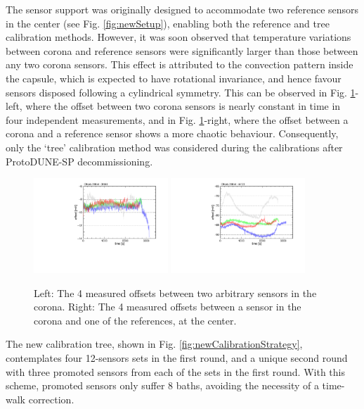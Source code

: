 \noindent The sensor support was originally designed to accommodate two reference sensors in the center (see Fig. \ref{fig:newSetup}), enabling both the reference and tree calibration methods. However, it was soon observed that temperature variations between corona and reference sensors were significantly larger than those between any two corona sensors. This effect is attributed to the convection pattern inside the capsule, which is expected to have rotational invariance, and hence favour sensors disposed following a cylindrical symmetry. This can be observed in Fig. \ref{fig:refMethodDumpingJustification}-left, where the offset between two corona sensors is nearly constant in time in four independent measurements, and in Fig. \ref{fig:refMethodDumpingJustification}-right, where the offset between a corona and a reference sensor shows a more chaotic behaviour. Consequently, only the `tree' calibration method was considered during the calibrations after ProtoDUNE-SP decommissioning.

\begin{figure}[htbp]
\centering
{\includegraphics[width=0.45\textwidth]{images/figure_17_a.pdf}}
{\includegraphics[width=0.45\textwidth]{images/figure_17_b.pdf}}
\caption{Left: The 4 measured offsets between two arbitrary sensors in the corona. Right: The 4 measured offsets between a sensor in the corona and one of the references, at the center.}
\label{fig:refMethodDumpingJustification}
\end{figure}

The new calibration tree, shown in Fig. \ref{fig:newCalibrationStrategy}, contemplates four 12-sensors sets in the first round, and a unique second round with three promoted sensors from each of the sets in the first round. With this scheme, promoted sensors only suffer 8 baths, avoiding the necessity of a time-walk correction.

